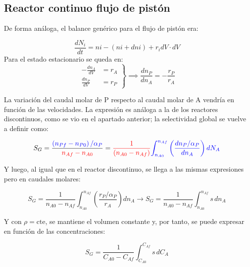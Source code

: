 \subsection{Reactor continuo flujo de pistón}
De forma análoga, el balance genérico para el flujo de pistón era:

\begin{equation}
  \frac{dN_i}{dt} = ni - (ni+dni) + r_i dV \cdot dV
\end{equation}
\noindent Para el estado estacionario se queda en: \\
\begin{equation}
  \left.
  \begin{aligned}
    -\frac{dn_A}{dV} & = r_A \\[10pt]
    \frac{dn_P}{dV}  & = r_P
  \end{aligned}
  \right\} \implies \frac{dn_P}{dn_A} = -\frac{r_P}{r_A}
  \label{eq:Sg_pfr}
\end{equation}

\noindent La variación del caudal molar de P respecto al caudal molar de A vendría en función de las velocidades. La expresión es análoga a la de los reactores discontinuos, como se vio en el apartado anterior; la selectividad global se vuelve a definir como:

\begin{equation}
  S_G = \frac{\textcolor{blue}{\left(n_{Pf}-n_{P0}\right)/\alpha_P}}{\textcolor{red}{n_{Af}-n_{A0}}} = \textcolor{red}{\frac{1}{(n_{A0}-n_{Af})}}\textcolor{blue}{\int_{n_{A0}}^{n_{Af}}\left(\frac{dn_P/\alpha_P}{dn_A}\right)dN_A}
\end{equation}
\newpage

\noindent Y luego, al igual que en el reactor discontinuo, se llega a las mismas expresiones pero en caudales molares:

\begin{equation}
  S_G = \frac{1}{n_{A0}-n_{Af}}\int_{n_{A0}}^{n_{Af}}\left(\frac{r_P/\alpha_P}{r_A}\right)dn_A \rightarrow \boxed{S_G=\frac{1}{n_{A0}-n_{Af}}\int_{n_{A0}}^{n_{Af}}s \, dn_A}
\end{equation}

\noindent Y con $\rho = \text{cte}$, se mantiene el volumen constante y, por tanto, se puede expresar en función de las concentraciones:

\begin{equation}
  \boxed{S_G = \frac{1}{C_{A0}-C_{Af}}\int_{C_{A0}}^{C_{Af}}s \, dC_A}
\end{equation}

